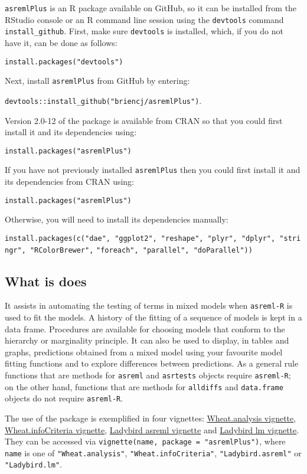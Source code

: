 \documentclass[
]{article}
\begin{document}
\texttt{asremlPlus} is an R package available on GitHub, so it can be
installed from the RStudio console or an R command line session using
the \texttt{devtools} command \texttt{install\_github}. First, make sure
\texttt{devtools} is installed, which, if you do not have it, can be
done as follows:

\texttt{install.packages("devtools")}

Next, install \texttt{asremlPlus} from GitHub by entering:

\texttt{devtools::install\_github("briencj/asremlPlus")}.

Version 2.0-12 of the package is available from CRAN so that you could
first install it and its dependencies using:

\texttt{install.packages("asremlPlus")}

If you have not previously installed \texttt{asremlPlus} then you could
first install it and its dependencies from CRAN using:

\texttt{install.packages("asremlPlus")}

Otherwise, you will need to install its dependencies manually:

\texttt{install.packages(c("dae",\ "ggplot2",\ "reshape",\ "plyr",\ "dplyr",\ "stringr",\ "RColorBrewer",}
\texttt{"foreach",\ "parallel",\ "doParallel"))}

\hypertarget{what-is-does}{%
\subsection{What is does}\label{what-is-does}}

It assists in automating the testing of terms in mixed models when
\texttt{asreml-R} is used to fit the models. A history of the fitting of
a sequence of models is kept in a data frame. Procedures are available
for choosing models that conform to the hierarchy or marginality
principle. It can also be used to display, in tables and graphs,
predictions obtained from a mixed model using your favourite model
fitting functions and to explore differences between predictions. As a
general rule functions that are methods for \texttt{asreml} and
\texttt{asrtests} objects require \texttt{asreml-R}; on the other hand,
functions that are methods for \texttt{alldiffs} and \texttt{data.frame}
objects do not require \texttt{asreml-R}.

The use of the package is exemplified in four vignettes:
\href{./vignettes/Wheat.analysis.pdf}{Wheat.analysis vignette},
\href{./vignettes/Wheat.infoCriteria.pdf}{Wheat.infoCriteria vignette},
\href{./vignettes/Ladybird.asreml.pdf}{Ladybird asreml vignette} and
\href{./vignettes/Ladybird.asreml.pdf}{Ladybird lm vignette}. They can
be accessed via \texttt{vignette(name,\ package\ =\ "asremlPlus")},
where \texttt{name} is one of \texttt{"Wheat.analysis"},
\texttt{"Wheat.infoCriteria"}, \texttt{"Ladybird.asreml"} or
\texttt{"Ladybird.lm"}.
\end{document}
